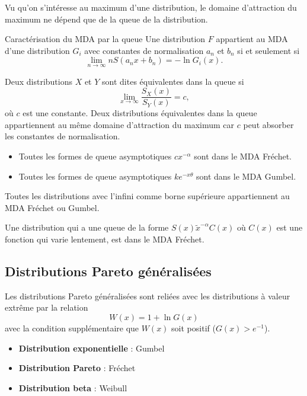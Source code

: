 Vu qu'on s'intéresse au maximum d'une distribution, le domaine d'attraction du maximum ne dépend que de la queue de la distribution. 

\begin{theoreme}{Caractérisation du MDA par la queue}{}
	Une distribution $F$ appartient au MDA d'une distribution $G_i$ avec constantes de normalisation $a_n$ et $b_n$ si et seulement si 
	$$\lim\limits_{n\to \infty} nS(a_n x + b_n) = -\ln G_i(x).$$
\end{theoreme}

Deux distributions $X$ et $Y$ sont dites équivalentes dans la queue si 
$$\lim\limits_{x\to \infty} \frac{S_X(x)}{S_Y(x)} = c,$$
où $c$ est une constante. Deux distributions équivalentes dans la queue appartiennent au même domaine d'attraction du maximum car $c$ peut absorber les constantes de normalisation. 

\begin{itemize}
	\item Toutes les formes de queue asymptotiques $cx^{-\alpha}$ sont dans le MDA Fréchet. 
	\item Toutes les formes de queue asymptotiques $ke^{-x\theta}$ sont dans le MDA Gumbel. 
\end{itemize}

Toutes les distributions avec l'infini comme borne supérieure appartiennent au MDA Fréchet ou Gumbel.

\begin{theoreme}{}{}
	Une distribution qui a une queue de la forme $S(x) \tilde x^{-\alpha} C(x)$ où $C(x)$ est une fonction qui varie lentement, est dans le MDA Fréchet. 
\end{theoreme}

\subsection{Distributions Pareto généralisées}

Les distributions Pareto généralisées sont reliées avec les distributions à valeur extrême par la relation 
$$W(x) = 1 + \ln G(x)$$
avec la condition supplémentaire que $W(x)$ soit positif ($G(x) > e^{-1}$).

\begin{itemize}
	\item \textbf{Distribution exponentielle} : Gumbel 
	\item \textbf{Distribution Pareto} : Fréchet
	\item \textbf{Distribution beta} : Weibull
\end{itemize}

